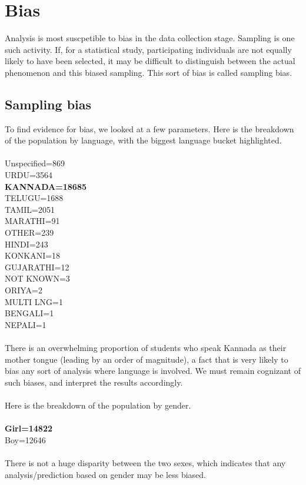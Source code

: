 \documentclass[10pt]{article}
\begin{document}
\newpage
\section{Bias}
Analysis is most suscpetible to bias in the data collection stage. Sampling is one such activity. If, for a statistical study, participating individuals are not equally likely to have been selected, it may be difficult to distinguish between the actual phenomenon and this biased sampling.
This sort of bias is called sampling bias.
\subsection{Sampling bias}
To find evidence for bias, we looked at a few parameters.
Here is the breakdown of the population by language, with the biggest language bucket highlighted.\\\\
Unspecified=869\\
URDU=3564\\
\textbf{KANNADA=18685}\\
TELUGU=1688\\
TAMIL=2051\\
MARATHI=91\\
OTHER=239\\
HINDI=243\\
KONKANI=18\\
GUJARATHI=12\\
NOT KNOWN=3\\
ORIYA=2\\
MULTI LNG=1\\
BENGALI=1\\
NEPALI=1\\
\\
There is an overwhelming proportion of students who speak Kannada as their mother tongue (leading by an order of magnitude), a fact that is very likely to bias any sort of analysis where language is involved. We must remain cognizant of such biases, and interpret the results accordingly.\\\\
Here is the breakdown of the population by gender.\\\\
\textbf{Girl=14822}\\
Boy=12646\\\\
There is not a huge disparity between the two sexes, which indicates that any analysis/prediction based on gender may be less biased.
\end{document}
